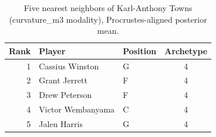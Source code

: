 \begin{table}[htbp]
  \centering\small
  \begin{tabular}{rllc}
    \toprule
    Rank & Player & Position & Archetype \\
    \midrule
    1 & Cassius Winston & G & 4 \\
    2 & Grant Jerrett & F & 4 \\
    3 & Drew Peterson & F & 4 \\
    4 & Victor Wembanyama & C & 4 \\
    5 & Jalen Harris & G & 4 \\
    \bottomrule
  \end{tabular}
  \caption{Five nearest neighbors of Karl-Anthony Towns (curvature_m3 modality), Procrustes-aligned posterior mean.}
  \label{tab:Karl_Anthony_Towns_neighbors_curvature_m3}
\end{table}

